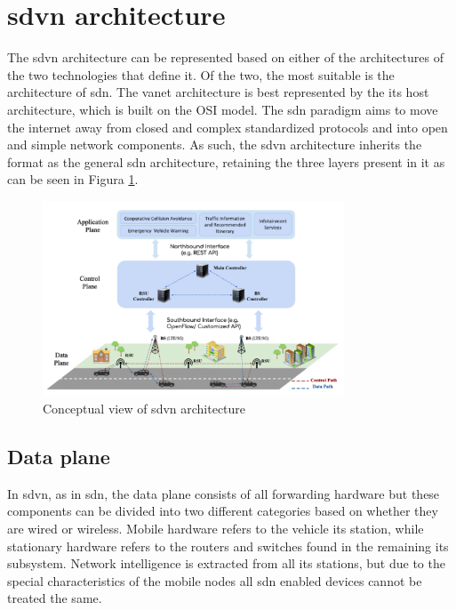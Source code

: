 \section[SDVN architecture]{\gls{sdvn} architecture}

The \gls{sdvn} architecture can be represented based on either of the architectures of the two technologies that define it. Of the two, the most suitable is the architecture of \gls{sdn}. The \gls{vanet} architecture is best represented by the \gls{its} host architecture, which is built on the OSI model. The \gls{sdn} paradigm aims to move the internet away from closed and complex standardized protocols and into open and simple network components. As such, the \gls{sdvn} architecture inherits the format as the general \gls{sdn} architecture, retaining the three layers present in it as can be seen in Figura \ref{fig:sdvn_arciotecture}. 

\begin{figure}
	\centering
	\includegraphics[width=0.8\textwidth]{Chapters/Figures/SDVNs/architecture.png}
	\caption{Conceptual view of \gls{sdvn} architecture\cite{toufga_towards_2020}}
	\label{fig:sdvn_arciotecture}
\end{figure}

\subsection{Data plane}

In \gls{sdvn}, as in \gls{sdn}, the data plane consists of all forwarding hardware but these components can be divided into two different categories based on whether they are wired or wireless. Mobile hardware refers to the vehicle \gls{its} station, while stationary hardware refers to the routers and switches found in the remaining \gls{its} subsystem. Network intelligence is extracted from all \gls{its} stations, but due to the special characteristics of the mobile nodes all \gls{sdn} enabled devices cannot be treated the same. 

